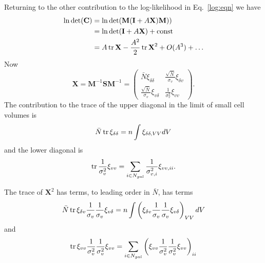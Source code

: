 \documentclass{article}
\begin{document}
Returning to the other contribution to the log-likelihood in Eq.~\ref{log:eqn} we have
\begin{align*}
\ln\det(\textbf{C}) &=\ln\det(\textbf{M}(\textbf{I}+A\textbf{X})\textbf{M})) \\
&= \ln\det(\textbf{I}+A\textbf{X}) +\text{const} \\
&= A \tr \textbf{X} -\frac{A^2}{2}\tr \textbf{X}^2+ O(A^3) + \ldots\\
\end{align*}
Now
\begin{equation}
\textbf{X} = \textbf{M}^{-1}\textbf{S}\textbf{M}^{-1} = 
\begin{pmatrix}
\bar{N}\xi_{\delta\delta} & \frac{\sqrt{\bar{N}}}{\sigma_{v}} \xi_{\delta v} \\
\frac{\sqrt{\bar{N}}}{\sigma_{v}} \xi_{v\delta} & \frac{1}{\sigma_{v}^2} \xi_{vv} 
\end{pmatrix}.
\end{equation}
The contribution to the trace of the upper diagonal in the limit of small cell volumes is
\begin{equation}
\bar{N} \tr \xi_{\delta\delta} = n \int \xi_{\delta\delta,VV} dV
\end{equation}
and the lower diagonal is
\begin{equation}
\tr  \frac{1}{\sigma_{v}^2} \xi_{vv} =  \sum_{i \in N_{gal}}   \frac{1}{\sigma_{v,i}^2} \xi_{vv,ii}.
\end{equation}

The trace of $\textbf{X}^2$ has terms, to leading order in $\bar{N}$, has terms
\begin{equation}
\bar{N}  \tr  \xi_{\delta v} \frac{1}{\sigma_{v}}  \frac{1}{\sigma_{v}}  \xi_{v \delta} = n \int \left( \xi_{\delta v} \frac{1}{\sigma_{v}}  \frac{1}{\sigma_{v}}  \xi_{v \delta} \right)_{VV} dV
\end{equation}
and 
\begin{equation}
\tr   \xi_{vv} \frac{1}{\sigma_{v}^2}  \frac{1}{\sigma_{v}^2} \xi_{vv} =  \sum_{i \in N_{gal}} \left(  \xi_{vv} \frac{1}{\sigma_{v}^2}  \frac{1}{\sigma_{v}^2} \xi_{vv} \right)_{ii}
\end{equation}
\end{document}
